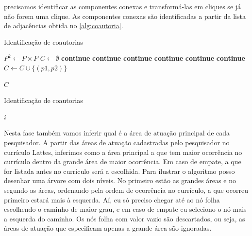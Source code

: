 precisamos identificar as componentes conexas e transformá-las em cliques se já não forem uma clique. As componentes conexas são identificadas a partir da lista de adjacências obtida no \autoref{alg:coautoria}.

\begin{algorithm}
\caption{Identificação de coautorias}
\label{alg:coautoria}
\begin{algorithmic}[1]

\State $P^2\gets P\times{P}$
\State $C\gets \emptyset$
\State \textbf{continue}
\State \textbf{continue}
\State \textbf{continue}
\State \textbf{continue}
\State \textbf{continue}
\State \textbf{continue}
\Else
\State $C\gets C\cup\{(p1, p2)\}$
\EndIf
\EndFor

\State \Return $C$
\EndProcedure

\end{algorithmic}
\end{algorithm}

\begin{algorithm}
\caption{Identificação de coautorias}
\label{alg:levenshtein}
\begin{algorithmic}[1]

\State \Return $i$
\EndProcedure

\end{algorithmic}
\end{algorithm}

Nesta fase também vamos inferir qual é a área de atuação principal de cada pesquisador. A partir das áreas de atuação cadastradas pelo pesquisador no currículo Lattes, inferimos como a área principal a que tem maior ocorrência no currículo dentro da grande área de maior ocorrência. Em caso de empate, a que for listada antes no currículo será a escolhida. Para ilustrar o algoritmo posso desenhar uma árvore com dois níveis. No primeiro estão as grandes áreas e no segundo as áreas, ordenando pela ordem de ocorrência no currículo, a que ocorreu primeiro estará mais à esquerda. Aí, eu só preciso chegar até ao nó folha escolhendo o caminho de maior grau, e em caso de empate eu seleciono o nó mais a esquerda do caminho. Os nós folha com valor vazio são descartados, ou seja, as áreas de atuação que especificam apenas a grande área são ignoradas.

